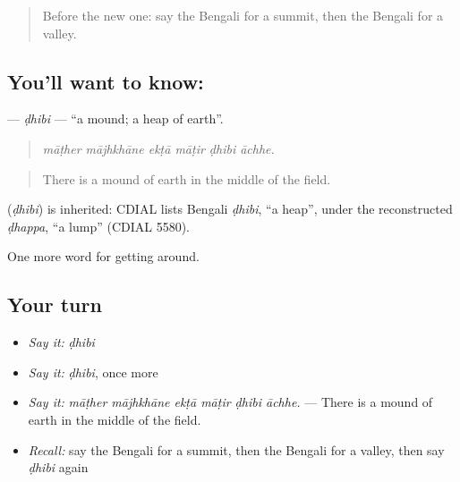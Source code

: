 \label{lesson:BN-C432-dhibi}



\begin{quote}
Before the new one: say the Bengali for a summit, then the Bengali for a valley.
\end{quote}

\subsection*{You'll want to know: }
\textbf{} — \emph{ḍhibi} — \textquotedblleft{}a mound; a heap of earth\textquotedblright{}.

\begin{quote}
     
\end{quote}

\begin{quote}
\emph{māṭher mājhkhāne ekṭā māṭir ḍhibi āchhe.}
\end{quote}

\begin{quote}
There is a mound of earth in the middle of the field.
\end{quote}

\begin{cousinweb}
\textbf{} (\emph{ḍhibi}) is inherited: CDIAL lists Bengali \emph{ḍhibi}, \textquotedblleft{}a heap\textquotedblright{}, under the reconstructed \emph{ḍhappa}, \textquotedblleft{}a lump\textquotedblright{} (CDIAL 5580).
\end{cousinweb}

\begin{grammarlens}[title={What you've built}]
One more word for getting around.
\end{grammarlens}

\subsection*{Your turn}
\begin{itemize}
\raggedright
  \item \emph{Say it:} \emph{ḍhibi}
  \item \emph{Say it:} \emph{ḍhibi}, once more
  \item \emph{Say it:} \emph{māṭher mājhkhāne ekṭā māṭir ḍhibi āchhe.} — There is a mound of earth in the middle of the field.
  \item \emph{Recall:} say the Bengali for a summit, then the Bengali for a valley, then say \emph{ḍhibi} again
\end{itemize}

